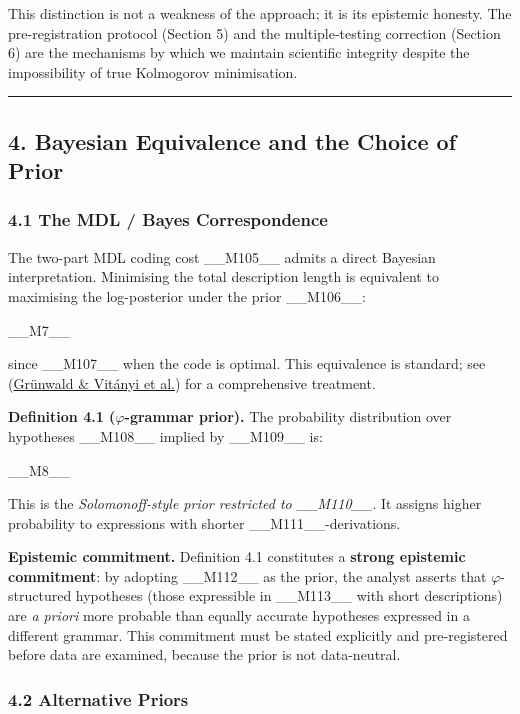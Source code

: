 This distinction is not a weakness of the approach; it is its epistemic honesty. The pre-registration protocol (Section 5) and the multiple-testing correction (Section 6) are the mechanisms by which we maintain scientific integrity despite the impossibility of true Kolmogorov minimisation.

\noindent\rule{\textwidth}{0.4pt}

\subsection{4. Bayesian Equivalence and the Choice of Prior}

\subsubsection{4.1 The MDL / Bayes Correspondence}

The two-part MDL coding cost \_\_M105\_\_ admits a direct Bayesian interpretation. Minimising the total description length is equivalent to maximising the log-posterior under the prior \_\_M106\_\_:

\_\_M7\_\_

since \_\_M107\_\_ when the code is optimal. This equivalence is standard; see (\href{https://homepages.cwi.nl/~paulv/papers/mdlindbayeskolmcompl.pdf}{Grünwald \& Vitányi et al.}) for a comprehensive treatment.

\textbf{Definition 4.1 ($\varphi$-grammar prior).} The probability distribution over hypotheses \_\_M108\_\_ implied by \_\_M109\_\_ is:

\_\_M8\_\_

This is the \textit{Solomonoff-style prior restricted to \_\_M110\_\_}. It assigns higher probability to expressions with shorter \_\_M111\_\_-derivations.

\textbf{Epistemic commitment.} Definition 4.1 constitutes a \textbf{strong epistemic commitment}: by adopting \_\_M112\_\_ as the prior, the analyst asserts that $\varphi$-structured hypotheses (those expressible in \_\_M113\_\_ with short descriptions) are \textit{a priori} more probable than equally accurate hypotheses expressed in a different grammar. This commitment must be stated explicitly and pre-registered before data are examined, because the prior is not data-neutral.

\subsubsection{4.2 Alternative Priors}

